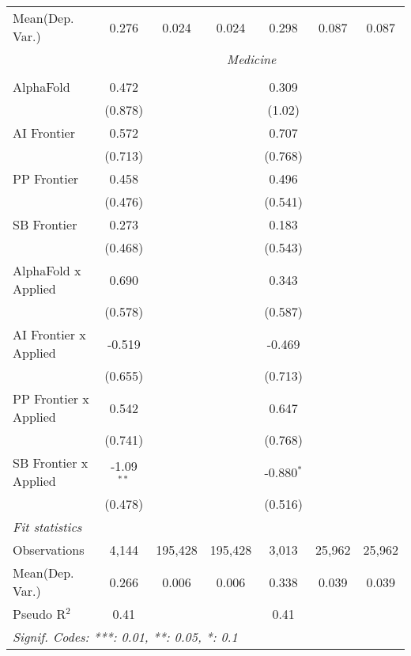 \begin{tabular}{lcccccc}
Mean(Dep. Var.) & 0.276 & 0.024 & 0.024 & 0.298 & 0.087 & 0.087 \\
 & \multicolumn{6}{c}{\textit{Medicine}} \\ \\
   AlphaFold             & 0.472        &         &         & 0.309        &        &   \\   
                         & (0.878)      &         &         & (1.02)       &        &   \\   
   AI Frontier           & 0.572        &         &         & 0.707        &        &   \\   
                         & (0.713)      &         &         & (0.768)      &        &   \\   
   PP Frontier           & 0.458        &         &         & 0.496        &        &   \\   
                         & (0.476)      &         &         & (0.541)      &        &   \\   
   SB Frontier           & 0.273        &         &         & 0.183        &        &   \\   
                         & (0.468)      &         &         & (0.543)      &        &   \\   
   AlphaFold x Applied   & 0.690        &         &         & 0.343        &        &   \\   
                         & (0.578)      &         &         & (0.587)      &        &   \\   
   AI Frontier x Applied & -0.519       &         &         & -0.469       &        &   \\   
                         & (0.655)      &         &         & (0.713)      &        &   \\   
   PP Frontier x Applied & 0.542        &         &         & 0.647        &        &   \\   
                         & (0.741)      &         &         & (0.768)      &        &   \\   
   SB Frontier x Applied & -1.09$^{**}$ &         &         & -0.880$^{*}$ &        &   \\   
                         & (0.478)      &         &         & (0.516)      &        &   \\   
   \midrule
   \emph{Fit statistics}\\
   Observations          & 4,144        & 195,428 & 195,428 & 3,013        & 25,962 & 25,962\\  
Mean(Dep. Var.) & 0.266 & 0.006 & 0.006 & 0.338 & 0.039 & 0.039 \\
   Pseudo R$^2$          & 0.41         &         &         & 0.41         &        & \\  
   \midrule \midrule
   \multicolumn{7}{l}{\emph{Signif. Codes: ***: 0.01, **: 0.05, *: 0.1}}\\
\end{tabular}
\par\endgroup
